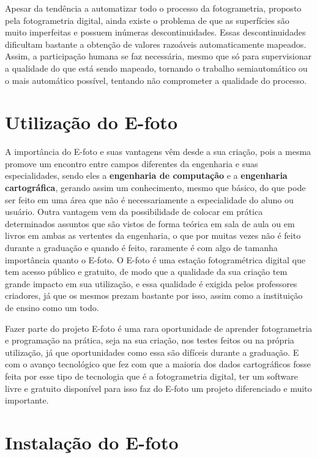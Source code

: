 Apesar da tendência a automatizar todo o processo da fotogrametria, proposto pela fotogrametria digital, ainda existe o problema de que as superfícies são muito imperfeitas e possuem inúmeras descontinuidades. Essas descontinuidades dificultam bastante a obtenção de valores razoáveis automaticamente mapeados. Assim, a participação humana se faz necessária, mesmo que só para supervisionar a qualidade do que está sendo mapeado, tornando o trabalho semiautomático ou o mais automático possível, tentando não comprometer a qualidade do processo.


\section{Utilização do E-foto}

A importância do E-foto e suas vantagens vêm desde a sua criação, pois a mesma promove um encontro entre campos diferentes da engenharia e suas especialidades, sendo eles a \textbf{engenharia de computação} e a \textbf{engenharia cartográfica}, gerando assim um conhecimento, mesmo que básico, do que pode ser feito em uma área que não é necessariamente a especialidade do aluno ou usuário. Outra vantagem vem da possibilidade de colocar em prática determinados assuntos que são vistos de forma teórica em sala de aula ou em livros em ambas as vertentes da engenharia, o que por muitas vezes não é feito durante a graduação e quando é feito, raramente é com algo de tamanha importância quanto o E-foto. O E-foto é uma estação fotogramétrica digital que tem acesso público e gratuito, de modo que a qualidade da sua criação tem grande impacto em sua utilização, e essa qualidade é exigida pelos professores criadores, já que os mesmos prezam bastante por isso, assim como a instituição de ensino como um todo.

Fazer parte do projeto E-foto é uma rara oportunidade de aprender fotogrametria e programação na prática, seja na sua criação, nos testes feitos ou na própria utilização, já que oportunidades como essa são difíceis durante a graduação. E com o avanço tecnológico que fez com que a maioria dos dados cartográficos fosse feita por esse tipo de tecnologia que é a fotogrametria digital, ter um software livre e gratuito disponível para isso faz do E-foto um projeto diferenciado e muito importante. %


\section{Instalação do E-foto}
